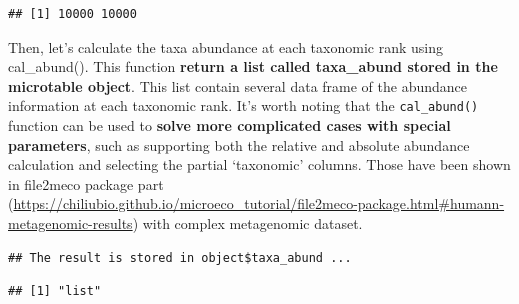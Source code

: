 \documentclass[
]{book}
\newenvironment{Shaded}{\begin{snugshade}}{\end{snugshade}}
\newcommand{\CommentTok}[1]{\textcolor[rgb]{0.56,0.35,0.01}{\textit{#1}}}
\newcommand{\DecValTok}[1]{\textcolor[rgb]{0.00,0.00,0.81}{#1}}
\newcommand{\FunctionTok}[1]{\textcolor[rgb]{0.00,0.00,0.00}{#1}}
\newcommand{\NormalTok}[1]{#1}
\newcommand{\SpecialCharTok}[1]{\textcolor[rgb]{0.00,0.00,0.00}{#1}}
\begin{document}
\begin{verbatim}
## [1] 10000 10000
\end{verbatim}

Then, let's calculate the taxa abundance at each taxonomic rank using cal\_abund().
This function \textbf{return a list called taxa\_abund stored in the microtable object}.
This list contain several data frame of the abundance information at each taxonomic rank.
It's worth noting that the \texttt{cal\_abund()} function can be used to \textbf{solve more complicated cases with special parameters},
such as supporting both the relative and absolute abundance calculation and selecting the partial `taxonomic' columns.
Those have been shown in file2meco package part (\url{https://chiliubio.github.io/microeco_tutorial/file2meco-package.html\#humann-metagenomic-results}) with complex metagenomic dataset.

\begin{Shaded}
\end{Shaded}

\begin{verbatim}
## The result is stored in object$taxa_abund ...
\end{verbatim}

\begin{Shaded}
\end{Shaded}

\begin{verbatim}
## [1] "list"
\end{verbatim}

\begin{Shaded}
\end{Shaded}
\end{document}
